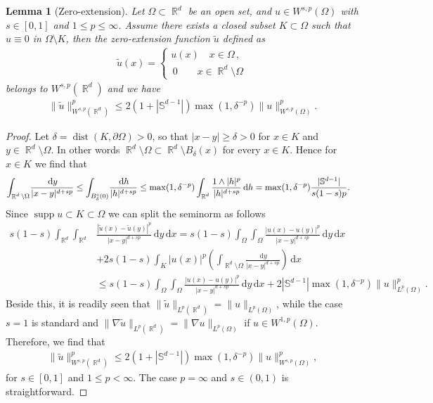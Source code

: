 \documentclass[12pt, reqno]{amsart}%
\theoremstyle{plain}  %
\newtheorem{lemma}[theorem]{Lemma}
\theoremstyle{definition}  %
\theoremstyle{remark}
\numberwithin{equation}{section}
\DeclareMathOperator{\dist}{dist}
\DeclareMathOperator{\supp}{supp}
\DeclareMathOperator{\R}{\mathbb{R}}
\renewcommand{\d}{\,\mathrm{d}}
\begin{document}
\begin{lemma}[Zero-extension]\label{lem:zero-exten}
Let $\Omega\subset \R^d$ be an open set, and $u\in W^{s,p}(\Omega)$ with $s\in[0,1]$ and
$1\leq p\leq \infty$. Assume there exists a closed subset $K\subset\Omega$ such that $u\equiv 0$ in $\Omega\setminus K$, then the zero-extension function $\widetilde{u}$ defined as
\begin{align*}
\widetilde{u}(x)=
\begin{cases}
  u(x) \quad x\in \Omega \,,\\
\,0 \qquad x\in \R^d \setminus \Omega\,
\end{cases}
\end{align*}
belongs to $W^{s,p}(\R^d)$ and we have
\begin{align*}
\|\widetilde{u}\|^p_{W^{s,p}(\R^d)} \leq 2(1+ |\mathbb{S}^{d-1}|) \max(1,\delta^{-p}) \|u\|^p_{W^{s,p}(\Omega)}  .
\end{align*}
\end{lemma}

\begin{proof}
Let $\delta=\dist(K,\partial\Omega)>0$, so that $|x-y|\geq \delta>0$ for $x\in K$ and $y\in\R^d\setminus \Omega$. In other words $ \R^d\setminus \Omega\subset \R^d\setminus B_\delta(x)$ for every $x\in K$. Hence  for $x\in K$ we find that
\begin{align*}
\int_{\R^d\setminus \Omega} \hspace{-0.4ex}\frac{\d y }{|x-y|^{d+sp}}
\leq \int_{B^c_\delta (0)}\hspace{-0.4ex}\frac{\d h }{|h|^{d+sp}}
&\leq \max(1,\delta^{-p}) \int_{\R^d}\frac{1\land |h|^p }{|h|^{d+sp}} \d h=  \max(1,\delta^{-p}) \frac{|\mathbb{S}^{d-1}|}{s(1-s)p}.
\end{align*}
Since $\supp u\subset K\subset\Omega$  we can split the seminorm as follows
\begin{align*}
s(1-s)\int_{\R^d}\int_{\R^d} &\frac{|\widetilde{u}(x)-\widetilde{u}(y)|^p}{|x-y|^{d+sp}} \d y\d x =  s(1-s) \int_{\Omega}\int_{\Omega} \frac{|u(x)-u(y)|^p}{|x-y|^{d+sp}} \d y \d x  \\
&+ 2 s(1-s) \int_{K}  |u(x)|^p \left( \int_{\R^d \setminus \Omega} \frac{\d y}{|x-y|^{d+sp}}\right)\d x\\
&\leq  s(1-s) \int_{\Omega}\int_{\Omega} \frac{|u(x)-u(y)|^p}{|x-y|^{d+sp}} \d y \d x + 2|\mathbb{S}^{d-1}| \max(1,\delta^{-p})\|u\|^p_{L^p(\Omega )}.
\end{align*}
Beside this, it is readily seen that  $\|\widetilde{u}\|_{L^p(\R^d)} =  \|u\|_{L^p(\Omega)}$, while  the case $s=1$  is standard and $\|\nabla \widetilde{u}\|_{L^p(\R^d)} =  \|\nabla u\|_{L^p(\Omega)}$ if $u\in W^{1,p}(\Omega)$.   Therefore, we find that
\begin{align*}
\|\widetilde{u}\|^p_{W^{s,p}(\R^d)} \leq 2(1+ |\mathbb{S}^{d-1}|) \max(1,\delta^{-p}) \|u\|^p_{W^{s,p}(\Omega)},
\end{align*}
for $s\in [0,1]$ and $1\leq p< \infty$. The case $p=\infty$ and $s\in (0,1)$ is straightforward.
\end{proof}
\end{document}

